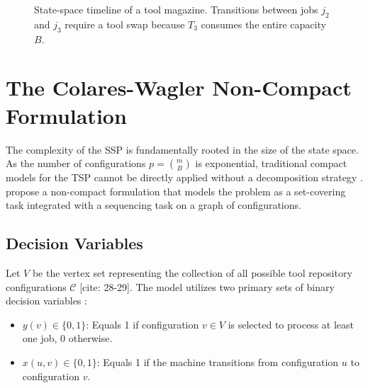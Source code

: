 \documentclass[12pt]{article}
\begin{document}
\begin{figure}[h!]
\centering
{}
\caption{State-space timeline of a tool magazine. Transitions between jobs $j_2$ and $j_3$ require a tool swap because $T_3$ consumes the entire capacity $B$.}
\label{fig:magazine_timeline}
\end{figure}

\section{The Colares-Wagler Non-Compact Formulation}

The complexity of the SSP is fundamentally rooted in the size of the state space. As the number of configurations $p = \binom{m}{B}$ is exponential, traditional compact models for the TSP cannot be directly applied without a decomposition strategy . \textcite{Colares2026} propose a non-compact formulation that models the problem as a set-covering task integrated with a sequencing task on a graph of configurations.

\subsection{Decision Variables}
Let $V$ be the vertex set representing the collection of all possible tool repository configurations $\mathcal{C}$ [cite: 28-29]. The model utilizes two primary sets of binary decision variables :
\begin{itemize}
    \item $y(v) \in \{0, 1\}$: Equals 1 if configuration $v \in V$ is selected to process at least one job, 0 otherwise.
    \item $x(u, v) \in \{0, 1\}$: Equals 1 if the machine transitions from configuration $u$ to configuration $v$.
\end{itemize}
\end{document}
